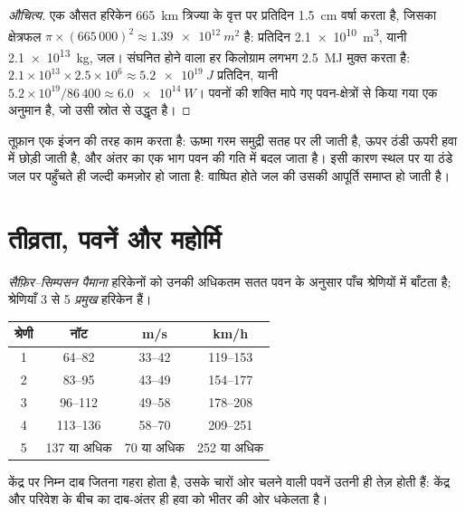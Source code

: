 \begin{proof}[औचित्य]
एक औसत हरिकेन \qty{665}{km} त्रिज्या के वृत्त पर प्रतिदिन \qty{1.5}{cm} वर्षा
करता है, जिसका क्षेत्रफल $\pi \times (665\,000)^2 \approx
\qty{1.39e12}{m^2}$ है: प्रतिदिन \qty{2.1e10}{m^3}, यानी \qty{2.1e13}{kg}, जल।
संघनित होने वाला हर किलोग्राम लगभग \qty{2.5}{MJ} मुक्त करता है: $2.1\times10^{13}
\times 2.5\times10^6 \approx \qty{5.2e19}{J}$ प्रतिदिन, यानी
$5.2\times10^{19}/86\,400 \approx \qty{6.0e14}{W}$। पवनों की शक्ति
मापे गए पवन-क्षेत्रों से किया गया एक अनुमान है, जो उसी स्रोत से उद्धृत है।
\end{proof}

तूफ़ान एक इंजन की तरह काम करता है: ऊष्मा गरम समुद्री सतह पर ली जाती है, ऊपर
ठंडी ऊपरी हवा में छोड़ी जाती है, और अंतर का एक भाग पवन की
गति में बदल जाता है। इसी कारण  स्थल पर या ठंडे जल पर पहुँचते ही
जल्दी कमज़ोर हो जाता है: वाष्पित होते जल की उसकी आपूर्ति
समाप्त हो जाती है।

\section{तीव्रता, पवनें और महोर्मि}

\begin{definition}[सैफ़िर--सिम्पसन पैमाना]\label{def:g10:storms-and-cyclones:scale}
\emph{सैफ़िर--सिम्पसन पैमाना} हरिकेनों को
उनकी अधिकतम सतत पवन के अनुसार पाँच श्रेणियों में बाँटता है; श्रेणियाँ
3 से 5 \emph{प्रमुख} हरिकेन हैं।
\end{definition}

\begin{center}
\small
\begin{tabular}{cccc}
\hline
श्रेणी & नॉट & \unit{m/s} & \unit{km/h} \\
\hline
1 & 64--82 & 33--42 & 119--153 \\
2 & 83--95 & 43--49 & 154--177 \\
3 & 96--112 & 49--58 & 178--208 \\
4 & 113--136 & 58--70 & 209--251 \\
5 & 137 या अधिक & 70 या अधिक & 252 या अधिक \\
\hline
\end{tabular}
\end{center}

केंद्र पर निम्न दाब जितना गहरा होता है, उसके चारों ओर चलने वाली पवनें उतनी ही
तेज़ होती हैं: केंद्र और परिवेश के बीच का दाब-अंतर ही
हवा को भीतर की ओर धकेलता है।

